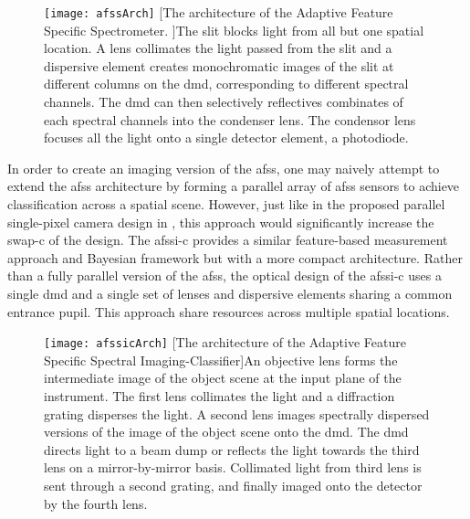 \begin{figure}
	\texttt{[image: afssArch]}
	[The architecture of the Adaptive Feature Specific Spectrometer. ]{The slit blocks light from all but one spatial location. A lens collimates the light passed from the slit and a dispersive element creates monochromatic images of the slit at different columns on the \gls{dmd}, corresponding to different spectral channels. The \gls{dmd} can then selectively reflectives combinates of each spectral channels into the condenser lens. The condensor lens focuses all the light onto a single detector element, a photodiode.}
	\label{fig:afssArch}
\end{figure}

In order to create an imaging version of the \gls{afss}, one may naively attempt to extend the \gls{afss} architecture by forming a parallel array of \gls{afss} sensors to achieve classification across a spatial scene. However, just like in the proposed parallel single-pixel camera design in , this approach would significantly increase the \gls{swap-c} of the design. The \gls{afssi-c} provides a similar feature-based measurement approach and Bayesian framework but with a more compact architecture. Rather than a fully parallel version of the \gls{afss}, the optical design of the \gls{afssi-c} uses a single \gls{dmd} and a single set of lenses and dispersive elements sharing a common entrance pupil. This approach share resources across multiple spatial locations.


\begin{figure}
	\texttt{[image: afssicArch]}
	[The architecture of the Adaptive Feature Specific Spectral Imaging-Classifier]{An objective lens forms the intermediate image of the object scene at the input plane of the instrument. The first lens collimates the light and a diffraction grating disperses the light. A second lens images spectrally dispersed versions of the image of the object scene onto the \gls{dmd}. The \gls{dmd} directs light to a beam dump or reflects the light towards the third lens on a mirror-by-mirror basis. Collimated light from third lens
is sent through a second grating, and finally imaged onto the detector by the fourth lens.}
	\label{fig:afssicArch}
\end{figure}


